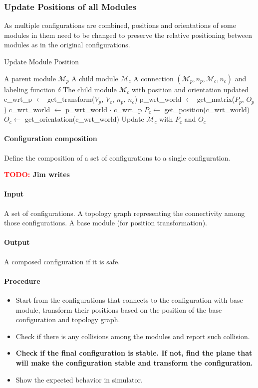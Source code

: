 \documentclass[conference]{IEEEtran}
\theoremstyle{definition}
\newcommand{\TODO}[1]{ {\bf \textcolor{red}{TODO:} #1 }}
\begin{document}
\subsubsection{Update Positions of all Modules} \label{sec:update_position}
As multiple configurations are combined, positions and orientations of some modules in them need to be changed to preserve the relative positioning between modules as in the original configurations.

\begin{algorithm}
\caption{Update Module Position}\label{alg:update_position}
\begin{algorithmic}[1]
\Require
\Statex A parent module $\mathcal{M}_p$
\Statex A child module $\mathcal{M}_c$
\Statex A connection $(\mathcal{M}_p, n_p, \mathcal{M}_c, n_c)$ and labeling function $\delta$
\Ensure
\Statex The child module $\mathcal{M}_c$ with position and orientation updated
\Statex
\State c\_wrt\_p $\gets$ get\_transform($V_p$, $V_c$, $n_p$, $n_c$)
\State p\_wrt\_world $\gets$ get\_matrix($P_p$, $O_p$)
\State c\_wrt\_world $\gets$ p\_wrt\_world $\cdot$ c\_wrt\_p
\State $P_c \gets$ get\_position(c\_wrt\_world)
\State $O_c \gets$ get\_orientation(c\_wrt\_world)
\State Update $\mathcal{M}_c$ with $P_c$ and $O_c$
\end{algorithmic}
\end{algorithm}


\paragraph{Configuration composition}
Define the composition of a set of configurations to a single configuration.

\TODO{Jim writes}
\paragraph{Input}
A set of configurations. A topology graph representing the connectivity among those configurations. A base module (for position transformation).
\paragraph{Output}
A composed configuration if it is safe.
\paragraph{Procedure}
\begin{itemize}
\item Start from the configurations that connects to the configuration with base module, transform their positions based on the position of the base configuration and topology graph.
\item Check if there is any collisions among the modules and report such collision.
\item \textbf{Check if the final configuration is stable. If not, find the plane that will make the configuration stable and transform the configuration.}
\item Show the expected behavior in simulator.
\end{itemize}
\end{document}
